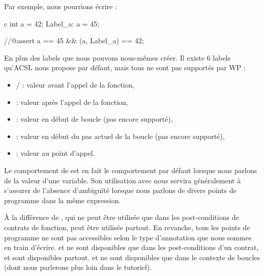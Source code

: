 Par exemple, nous pourrions écrire :



\begin{CodeBlock}{c}
  int a = 42;
 Label_a:
  a = 45;

  //@assert a == 45 && \at(a, Label_a) == 42;
\end{CodeBlock}



En plus des labels que nous pouvons nous-mêmes créer. Il existe 6 labels 
qu'ACSL nous propose par défaut, mais tous ne sont pas supportés par WP :



\begin{itemize}
\item {}/ : valeur avant l'appel de la fonction,
\item {} : valeur après l'appel de la fonction,
\item {} : valeur en début de boucle (pas encore supporté),
\item {} : valeur en début du pas actuel de la boucle (pas encore
supporté),
\item {} : valeur au point d'appel.
\end{itemize}


\begin{Information}
Le comportement de  est en fait le comportement par défaut lorsque
nous parlons de la valeur d'une variable. Son utilisation avec  nous 
servira généralement à s'assurer de l'absence d’ambiguïté lorsque nous parlons
de divers points de programme dans la même expression.
\end{Information}


À la différence de , qui ne peut être utilisée que dans les 
post-conditions de contrats de fonction,  peut être utilisée partout.
En revanche, tous les points de programme ne sont pas accessibles selon le type
d'annotation que nous sommes en train d'écrire.  et  ne sont 
disponibles que dans les post-conditions d'un contrat,  et 
sont disponibles partout.  et  ne sont 
disponibles que dans le contexte de boucles (dont nous parlerons plus loin dans
le tutoriel).



